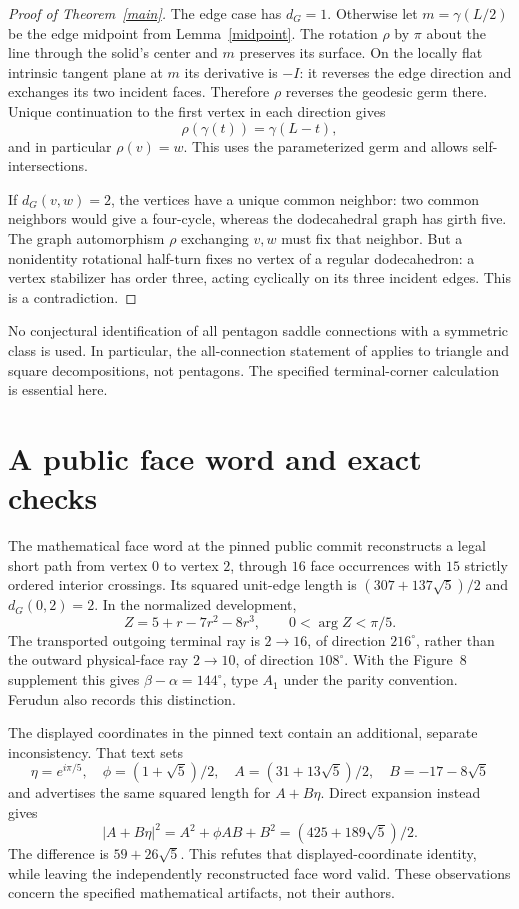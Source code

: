 \documentclass[11pt]{amsart}
\theoremstyle{remark}
\begin{document}
\begin{proof}[Proof of Theorem~\ref{main}]
The edge case has $d_G=1$. Otherwise let $m=\gamma(L/2)$ be the edge midpoint from Lemma~\ref{midpoint}. The rotation $\rho$ by $\pi$ about the line through the solid's center and $m$ preserves its surface. On the locally flat intrinsic tangent plane at $m$ its derivative is $-I$: it reverses the edge direction and exchanges its two incident faces. Therefore $\rho$ reverses the geodesic germ there. Unique continuation to the first vertex in each direction gives
\[
                          \rho(\gamma(t))=\gamma(L-t),
\]
and in particular $\rho(v)=w$. This uses the parameterized germ and allows self-intersections.

If $d_G(v,w)=2$, the vertices have a unique common neighbor: two common neighbors would give a four-cycle, whereas the dodecahedral graph has girth five. The graph automorphism $\rho$ exchanging $v,w$ must fix that neighbor. But a nonidentity rotational half-turn fixes no vertex of a regular dodecahedron: a vertex stabilizer has order three, acting cyclically on its three incident edges. This is a contradiction.
\end{proof}

No conjectural identification of all pentagon saddle connections with a symmetric class is used. In particular, the all-connection statement of \cite[Proposition~5.3]{AAH} applies to triangle and square decompositions, not pentagons. The specified terminal-corner calculation is essential here.

\section{A public face word and exact checks}
The mathematical face word at the pinned public commit \cite{Danny} reconstructs a legal short path from vertex $0$ to vertex $2$, through $16$ face occurrences with $15$ strictly ordered interior crossings. Its squared unit-edge length is $(307+137\sqrt5)/2$ and $d_G(0,2)=2$. In the normalized development,
\[
 Z=5+r-7r^2-8r^3,\qquad 0<\arg Z<\pi/5.
\]
The transported outgoing terminal ray is $2\to16$, of direction $216^\circ$, rather than the outward physical-face ray $2\to10$, of direction $108^\circ$. With the Figure~8 supplement this gives $\beta-\alpha=144^\circ$, type $A_1$ under the parity convention. Ferudun \cite[Remark~7.4]{Ferudun} also records this distinction.

The displayed coordinates in the pinned text contain an additional, separate inconsistency. That text sets
\[
 \eta=e^{i\pi/5},\quad \phi=(1+\sqrt5)/2,\quad
 A=(31+13\sqrt5)/2,\quad B=-17-8\sqrt5
\]
and advertises the same squared length for $A+B\eta$. Direct expansion instead gives
\[
 |A+B\eta|^2=A^2+\phi AB+B^2=(425+189\sqrt5)/2.
\]
The difference is $59+26\sqrt5$. This refutes that displayed-coordinate identity, while leaving the independently reconstructed face word valid. These observations concern the specified mathematical artifacts, not their authors.
\end{document}
